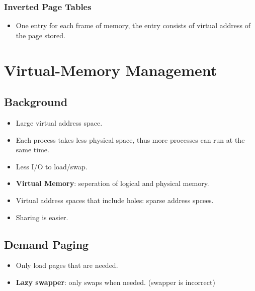 \documentclass[10pt]{report}
\begin{document}
		\subsection{Inverted Page Tables}
			\begin{itemize}
				\item One entry for each frame of memory, the entry consists of virtual address of the page stored.
			\end{itemize}


\chapter{Virtual-Memory Management} \label{ch:Chapter9}
	\section{Background}
		\begin{itemize}
			\item Large virtual address space.
			\item Each process takes less physical space, thus more processes can run at the same time.
			\item Less I/O to load/swap.
			\item \textbf{Virtual Memory}: seperation of logical and physical memory.
			\item Virtual address spaces that include holes: sparse address spcees.
			\item Sharing is easier.
		\end{itemize}

	\section{Demand Paging}
		\begin{itemize}
			\item Only load pages that are needed.
			\item \textbf{Lazy swapper}: only swaps when needed. (swapper is incorrect)
		\end{itemize}
\end{document}
